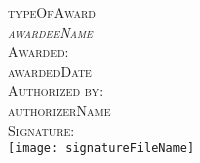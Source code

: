 \documentclass[landscape]{article}
\begin{document}
\begin{center}
\Huge
\textsc{typeOfAward}
\bigskip 
\\  
\textsc{\emph{awardeeName}}
\bigskip
\\ 
\textsc{Awarded:} 
\bigskip
\\ 
\textsc{awardedDate}
\bigskip
\\ 
\textsc{Authorized by:} 
\bigskip
\\ 
\textsc{authorizerName}
\bigskip
\\ 
\textsc{Signature: }
\bigskip
\\ 
\texttt{[image: signatureFileName]}
\end{center}
\end{document}
